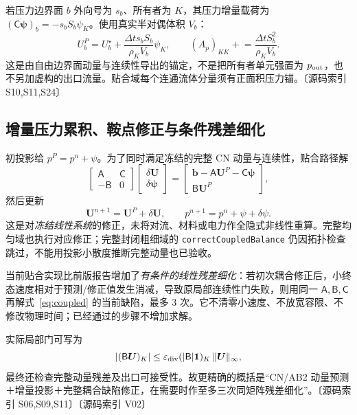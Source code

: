 \documentclass[UTF8,a4paper,11pt,fontset=fandol]{ctexart}
\newcommand{\code}[1]{\nolinkurl{#1}}
\newcommand{\src}[1]{\textcolor{ink}{\small〔源码索引 #1〕}}
\newcommand{\UU}{\bm{U}}
\newcommand{\dt}{\Delta t}
\newcommand{\mat}[1]{\mathsf{#1}}
\begin{document}
若压力边界面 $b$ 外向号为 $s_b$、所有者为 $K$，其压力增量载荷为 $(\mat C\bm\psi)_b=-s_bS_b\psi_K$。使用真实半对偶体积 $V_b$：
\begin{equation}
 U_b^P=U_b^\star+\frac{\dt s_bS_b}{\rho_KV_b}\psi_K,
 \qquad (A_p)_{KK}\mathrel{+}=\frac{\dt S_b^2}{\rho_KV_b}.
\end{equation}
这是由自由边界面动量与连续性导出的锚定，不是把所有者单元强置为 $p_{\rm out}$，也不另加虚构的出口流量。贴合域每个连通流体分量须有正面积压力锚。\src{S10,S11,S24}

\subsection{增量压力累积、鞍点修正与条件残差细化}
初投影给 $p^P=p^n+\psi$。为了同时满足冻结的完整 CN 动量与连续性，贴合路径解
\begin{equation}
 \begin{bmatrix}\mat A&\mat C\\-\mat B&0\end{bmatrix}
 \begin{bmatrix}\delta\UU\\\delta\bm\psi\end{bmatrix}
 =\begin{bmatrix}\bm b-\mat A\UU^P-\mat C\bm\psi\\\mat B\UU^P\end{bmatrix},
 \label{eq:coupled}
\end{equation}
然后更新
\begin{equation}
 \UU^{n+1}=\UU^P+\delta\UU,\qquad
 p^{n+1}=p^n+\psi+\delta\psi.
\end{equation}
这是对\emph{冻结线性系统}的修正，未将对流、材料或电力作全隐式非线性重算。完整均匀域也执行对应修正；完整封闭粗细域的 \code{correctCoupledBalance} 仍因拓扑检查跳过，不能用投影小散度推断完整动量也已验收。

当前贴合实现比前版报告增加了\emph{有条件的线性残差细化}：若初次耦合修正后，小终态速度相对于预测/修正值发生消减，导致原局部连续性门失败，则用同一 $\mat A,\mat B,\mat C$ 再解式~\eqref{eq:coupled} 的当前缺陷，最多 3 次。它不清零小速度、不放宽容限、不修改物理时间；已经通过的步骤不增加求解。

实际局部门可写为
\begin{equation}
 |(\mat B\UU)_K|\le\varepsilon_{\rm div}
       (|\mat B|\bm1)_K\,\|\UU\|_\infty,
\end{equation}
最终还检查完整动量残差及出口可接受性。故更精确的概括是“CN/AB2 动量预测＋增量投影＋完整耦合缺陷修正，在需要时作至多三次同矩阵残差细化”。\src{S06,S09,S11}\src{V02}
\end{document}
